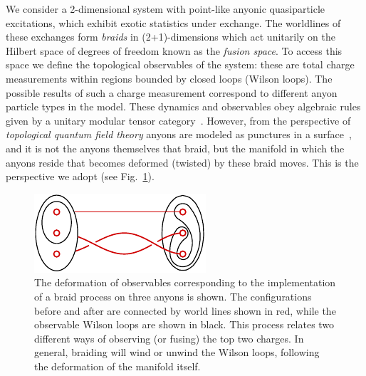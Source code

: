 \documentclass[aps, prl, letterpaper, twocolumn, superscriptaddress, notitlepage, 10pt]{revtex4}
\newcommand{\Fref}[1]{Fig.~\ref{#1}}
\newcommand{\cggb}[1]{\textcolor{blue}{#1}}
\newcommand{\dude}[1]{\textcolor{red}{#1}}
\begin{document}
We consider a 
2-dimensional system with
point-like anyonic quasiparticle excitations, which exhibit exotic statistics under exchange.
The worldlines of these exchanges form \emph{braids}
in (2+1)-dimensions
which act unitarily on the Hilbert space of degrees of freedom known as the \emph{fusion space}.
To access this space we define
the topological observables of the system: these
are total charge measurements within regions bounded by %
closed loops (Wilson loops).
The possible results of such a charge measurement correspond to different anyon particle types in the model.
These dynamics and observables obey algebraic rules
given by a unitary modular tensor category~\cite{Wang2010b}. %
However, from the perspective of
\emph{topological quantum field theory}
anyons are modeled
as punctures in a surface~\cite{Pfeifer2014}, and it is not
the anyons themselves that braid,
but the manifold in which the anyons reside 
that becomes deformed (twisted) by these braid moves.
This is the perspective we adopt (see \Fref{f:braidloop}).



\begin{figure}[t!]
\begin{center}
    \includegraphics[]{pic-braid-loop.pdf}
\caption{
The deformation of observables corresponding to the implementation of a braid process on three anyons is shown. The configurations before and after are connected by world lines shown in red, while the observable Wilson loops are shown in black.
This process relates two different ways of observing (or fusing) the top two charges.
In general, braiding will wind or unwind the Wilson loops, following
the deformation of the manifold itself.
\label{f:braidloop}
}
\end{center}
\vspace{-10pt}
\end{figure}
\end{document}
